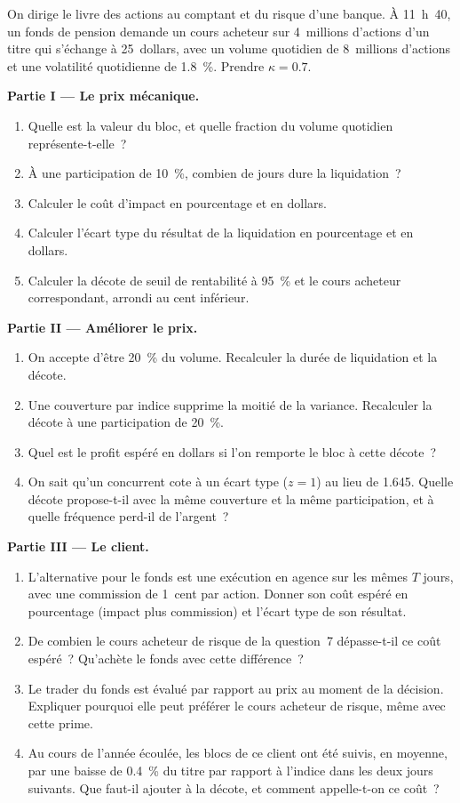 \begin{problem}\label{pb:m1:the-sell-side:1}
On dirige le livre des actions au comptant et du risque d'une banque. À 11~h~40, un fonds de pension demande
un cours acheteur sur 4~millions d'actions d'un titre qui s'échange à 25~dollars, avec un volume quotidien
de 8~millions d'actions et une volatilité quotidienne de 1.8~\%. Prendre $\kappa = 0.7$.

\medskip\noindent\textbf{Partie I --- Le prix mécanique.}
\begin{enumerate}
\item Quelle est la valeur du bloc, et quelle fraction du volume quotidien représente-t-elle~?
\item À une participation de 10~\%, combien de jours dure la liquidation~?
\item Calculer le coût d'impact en pourcentage et en dollars.
\item Calculer l'écart type du résultat de la liquidation en pourcentage et en
dollars.
\item Calculer la décote de seuil de rentabilité à 95~\% et le cours acheteur correspondant,
arrondi au cent inférieur.
\end{enumerate}

\medskip\noindent\textbf{Partie II --- Améliorer le prix.}
\begin{enumerate}[resume]
\item On accepte d'être 20~\% du volume. Recalculer la durée de liquidation
et la décote.
\item Une couverture par indice supprime la moitié de la variance. Recalculer la décote à
une participation de 20~\%.
\item Quel est le profit espéré en dollars si l'on remporte le bloc à
cette décote~?
\item On sait qu'un concurrent cote à un écart type ($z = 1$)
au lieu de 1.645. Quelle décote propose-t-il avec la même couverture et la même
participation, et à quelle fréquence perd-il de l'argent~?
\end{enumerate}

\medskip\noindent\textbf{Partie III --- Le client.}
\begin{enumerate}[resume]
\item L'alternative pour le fonds est une exécution en agence sur les mêmes
$T$ jours, avec une commission de 1~cent par action. Donner son coût espéré en
pourcentage (impact plus commission) et l'écart type de son résultat.
\item De combien le cours acheteur de risque de la question~7 dépasse-t-il ce
coût espéré~? Qu'achète le fonds avec cette différence~?
\item Le trader du fonds est évalué par rapport au prix au moment de la
décision. Expliquer pourquoi elle peut préférer le cours acheteur de risque, même avec cette prime.
\item Au cours de l'année écoulée, les blocs de ce client ont été suivis, en moyenne, par
une baisse de 0.4~\% du titre par rapport à l'indice dans les deux jours suivants.
Que faut-il ajouter à la décote, et comment appelle-t-on ce coût~?
\end{enumerate}


\end{problem}
